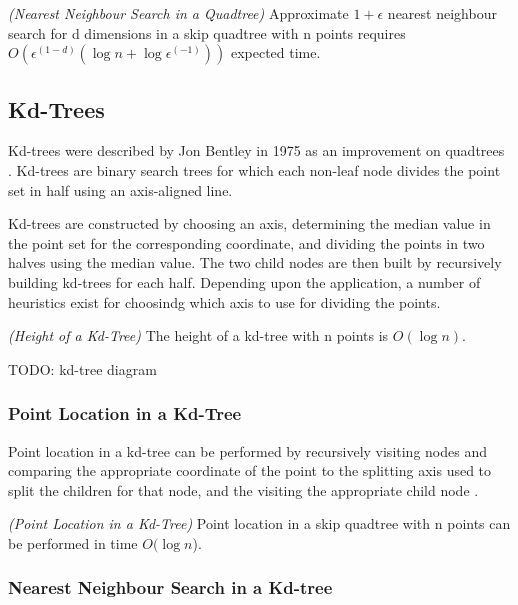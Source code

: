 \documentclass[mcs]{scsthesis}
\begin{document}
\begin{thm} \emph{(Nearest Neighbour Search in a Quadtree)} 
Approximate \(1 + \epsilon\) nearest neighbour search for d dimensions in a skip
quadtree with n points requires
\(O(\epsilon^(1 - d)(\log n + \log \epsilon^(-1)))\) expected time.
\end{thm}

\subsection{Kd-Trees}

Kd-trees were described by Jon Bentley in 1975 as an improvement on quadtrees
\cite{kdtree}.  Kd-trees are binary search trees for which each non-leaf node
divides the point set in half using an axis-aligned line.

Kd-trees are constructed by choosing an axis, determining the median value in
the point set for the corresponding coordinate, and dividing the points in two
halves using the median value.  The two child nodes are then built by
recursively building kd-trees for each half.  Depending upon the application,
a number of heuristics exist for choosindg which axis to use for dividing the
points.

\begin{thm} \emph{(Height of a Kd-Tree)}
The height of a kd-tree with n points is \(O(\log n)\).
\end{thm}

TODO: kd-tree diagram

\subsubsection{Point Location in a Kd-Tree}

Point location in a kd-tree can be performed by recursively visiting nodes and
comparing the appropriate coordinate of the point to the splitting axis used
to split the children for that node, and the visiting the appropriate child
node \cite{kdtree}.

\begin{thm} \emph{(Point Location in a Kd-Tree)} 
Point location in a skip quadtree with n points can be performed in time
\(O(\log n\)). 
\end{thm}

\subsubsection{Nearest Neighbour Search in a Kd-tree}
\end{document}
